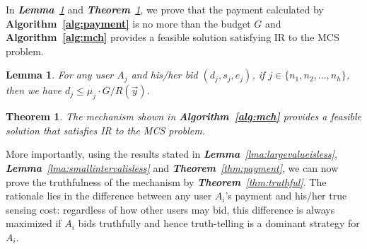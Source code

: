 \documentclass[10pt,journal,compsoc]{IEEEtran}
\newtheorem{theorem}{\textbf{Theorem}}
\newtheorem{lemma}{\textbf{Lemma}}
\begin{document}
  In \textit{\textbf{Lemma}~\ref{lma:biddingbound}} and \textit{\textbf{Theorem}~\ref{thm:correctmch}}, we prove that the payment calculated by \textbf{Algorithm~\ref{alg:payment}} is no more than the budget $G$ and \textbf{Algorithm~\ref{alg:mch}} provides a feasible solution satisfying IR to the MCS problem.
\begin{lemma}
    For any user $A_j$ and his/her bid $(d_{j},s_{j},e_{j})$, if $j\in \{n_1,n_2,...,n_h\}$, then we have $d_{j}\leq \mu_{j}\cdot G/R(\vec{y})$.
    \label{lma:biddingbound}
  \end{lemma}
\begin{theorem}
    The mechanism shown in \textbf{Algorithm~\ref{alg:mch}} provides a feasible solution that satisfies IR to the MCS problem.
    \label{thm:correctmch}
  \end{theorem}




  More importantly, using the results stated in \textit{\textbf{Lemma}~\ref{lma:largevalueisless}}, \textit{\textbf{Lemma}~\ref{lma:smallintervalisless}} and \textit{\textbf{Theorem}~\ref{thm:payment}}, we can now prove the truthfulness of the mechanism by \textit{\textbf{Theorem}~\ref{thm:truthful}}. The rationale lies in the difference between any user $A_i$'s payment and his/her true sensing cost: regardless of how other users may bid, this difference is always maximized if $A_i$ bids truthfully and hence truth-telling is a dominant strategy for $A_i$.
\end{document}
